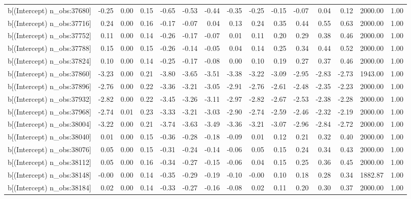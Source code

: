 \begin{table}[ht]
\begin{tabular}{rrrrrrrrrrrrrrr}
  b[(Intercept) n\_obs:37680] & -0.25 & 0.00 & 0.15 & -0.65 & -0.53 & -0.44 & -0.35 & -0.25 & -0.15 & -0.07 & 0.04 & 0.12 & 2000.00 & 1.00 \\ 
  b[(Intercept) n\_obs:37716] & 0.24 & 0.00 & 0.16 & -0.17 & -0.07 & 0.04 & 0.13 & 0.24 & 0.35 & 0.44 & 0.55 & 0.63 & 2000.00 & 1.00 \\ 
  b[(Intercept) n\_obs:37752] & 0.11 & 0.00 & 0.14 & -0.26 & -0.17 & -0.07 & 0.01 & 0.11 & 0.20 & 0.29 & 0.38 & 0.46 & 2000.00 & 1.00 \\ 
  b[(Intercept) n\_obs:37788] & 0.15 & 0.00 & 0.15 & -0.26 & -0.14 & -0.05 & 0.04 & 0.14 & 0.25 & 0.34 & 0.44 & 0.52 & 2000.00 & 1.00 \\ 
  b[(Intercept) n\_obs:37824] & 0.10 & 0.00 & 0.14 & -0.25 & -0.17 & -0.08 & 0.00 & 0.10 & 0.19 & 0.27 & 0.37 & 0.46 & 2000.00 & 1.00 \\ 
  b[(Intercept) n\_obs:37860] & -3.23 & 0.00 & 0.21 & -3.80 & -3.65 & -3.51 & -3.38 & -3.22 & -3.09 & -2.95 & -2.83 & -2.73 & 1943.00 & 1.00 \\ 
  b[(Intercept) n\_obs:37896] & -2.76 & 0.00 & 0.22 & -3.36 & -3.21 & -3.05 & -2.91 & -2.76 & -2.61 & -2.48 & -2.35 & -2.23 & 2000.00 & 1.00 \\ 
  b[(Intercept) n\_obs:37932] & -2.82 & 0.00 & 0.22 & -3.45 & -3.26 & -3.11 & -2.97 & -2.82 & -2.67 & -2.53 & -2.38 & -2.28 & 2000.00 & 1.00 \\ 
  b[(Intercept) n\_obs:37968] & -2.74 & 0.01 & 0.23 & -3.33 & -3.21 & -3.03 & -2.90 & -2.74 & -2.59 & -2.46 & -2.32 & -2.19 & 2000.00 & 1.00 \\ 
  b[(Intercept) n\_obs:38004] & -3.22 & 0.00 & 0.21 & -3.74 & -3.63 & -3.49 & -3.36 & -3.21 & -3.07 & -2.96 & -2.84 & -2.72 & 2000.00 & 1.00 \\ 
  b[(Intercept) n\_obs:38040] & 0.01 & 0.00 & 0.15 & -0.36 & -0.28 & -0.18 & -0.09 & 0.01 & 0.12 & 0.21 & 0.32 & 0.40 & 2000.00 & 1.00 \\ 
  b[(Intercept) n\_obs:38076] & 0.05 & 0.00 & 0.15 & -0.31 & -0.24 & -0.14 & -0.06 & 0.05 & 0.15 & 0.24 & 0.34 & 0.43 & 2000.00 & 1.00 \\ 
  b[(Intercept) n\_obs:38112] & 0.05 & 0.00 & 0.16 & -0.34 & -0.27 & -0.15 & -0.06 & 0.04 & 0.15 & 0.25 & 0.36 & 0.45 & 2000.00 & 1.00 \\ 
  b[(Intercept) n\_obs:38148] & -0.00 & 0.00 & 0.14 & -0.35 & -0.29 & -0.19 & -0.10 & -0.00 & 0.10 & 0.18 & 0.28 & 0.34 & 1882.87 & 1.00 \\ 
  b[(Intercept) n\_obs:38184] & 0.02 & 0.00 & 0.14 & -0.33 & -0.27 & -0.16 & -0.08 & 0.02 & 0.11 & 0.20 & 0.30 & 0.37 & 2000.00 & 1.00 \\ 

\end{tabular}
\end{table}
